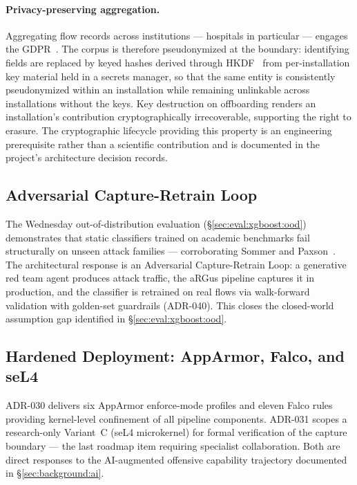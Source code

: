\documentclass[11pt,a4paper]{article}
\begin{document}
    \paragraph{Privacy-preserving aggregation.}
    Aggregating flow records across institutions --- hospitals in particular --- engages
    the GDPR~\cite{gdpr2016}. The corpus is therefore pseudonymized at the boundary:
    identifying fields are replaced by keyed hashes derived through HKDF~\cite{rfc5869}
    from per-installation key material held in a secrets manager, so that the same entity
    is consistently pseudonymized within an installation while remaining unlinkable across
    installations without the keys. Key destruction on offboarding renders an
    installation's contribution cryptographically irrecoverable, supporting the right to
    erasure. The cryptographic lifecycle providing this property is an engineering
    prerequisite rather than a scientific contribution and is documented in the project's
    architecture decision records.

    \subsection{Adversarial Capture-Retrain Loop}
    \label{sec:future:acrl}
    The Wednesday out-of-distribution evaluation (\S\ref{sec:eval:xgboost:ood}) demonstrates
    that static classifiers trained on academic benchmarks fail structurally on unseen attack
    families --- corroborating Sommer and Paxson~\cite{sommer2010}. The architectural response
    is an Adversarial Capture-Retrain Loop: a generative red team agent produces attack traffic,
    the aRGus pipeline captures it in production, and the classifier is retrained on real flows
    via walk-forward validation with golden-set guardrails (ADR-040). This closes the
    closed-world assumption gap identified in \S\ref{sec:eval:xgboost:ood}.

    \subsection{Hardened Deployment: AppArmor, Falco, and seL4}
    \label{sec:future:hardened}
    ADR-030 delivers six AppArmor enforce-mode profiles and eleven Falco rules providing
    kernel-level confinement of all pipeline components. ADR-031 scopes a research-only
    Variant~C (seL4 microkernel) for formal verification of the capture boundary ---
    the last roadmap item requiring specialist collaboration. Both are direct responses
    to the AI-augmented offensive capability trajectory documented in \S\ref{sec:background:ai}.
\end{document}
